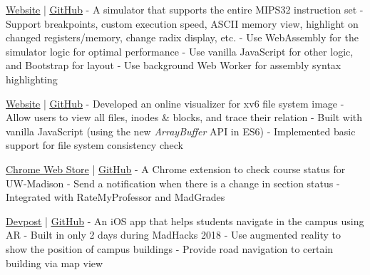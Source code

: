 \documentclass[letterpaper]{twentysecondcv} %
\begin{document}
\begin{twenty} %
    {\href{https://shawnzhong.github.io/JsSpim/}{\underline{Website}} | \href{https://github.com/ShawnZhong/JsSpim}{\underline{GitHub}}}
    {
     - A simulator that supports the entire MIPS32 instruction set \newline
     - Support breakpoints, custom execution speed, ASCII memory view, highlight on changed registers/memory, change radix display, etc. \newline
     - Use WebAssembly for the simulator logic for optimal performance \newline
     - Use vanilla JavaScript for other logic, and Bootstrap for layout \newline
     - Use background Web Worker for assembly syntax highlighting \newline
    }
    
	 {\href{https://shawnzhong.github.io/xv6-file-system-visualizer/}{\underline{Website}} | \href{https://github.com/ShawnZhong/xv6-file-system-visualizer}{\underline{GitHub}}}
	{
	    - Developed an online visualizer for xv6 file system image \newline
	    - Allow users to view all files, inodes \& blocks, and trace their relation \newline
	    - Built with vanilla JavaScript (using the new \textit{ArrayBuffer} API in ES6) \newline
	    - Implemented basic support for file system consistency check \newline
	}
	
	 {\href{https://chrome.google.com/webstore/detail/madcourse/cijpakgnnndjbilnioofmgdededkdmpc}{\underline{Chrome Web Store}} | \href{https://github.com/ShawnZhong/MadCourse}{\underline{GitHub}}}
	{
	    - A Chrome extension to check course status for UW-Madison \newline
	    - Send a notification when there is a change in section status \newline
	    - Integrated with RateMyProfessor and MadGrades \newline
	}
	
	 {\href{https://devpost.com/software/badger-map-k256i9}{\underline{Devpost}} | \href{https://github.com/ShawnZhong/Badger-Map}{\underline{GitHub}}}
	{
	    - An iOS app that helps students navigate in the campus using AR \newline
	    - Built in only 2 days during MadHacks 2018 \newline
	    - Use augmented reality to show the position of campus buildings \newline
	    - Provide road navigation to certain building via map view
	}
\end{twenty}
\end{document}
